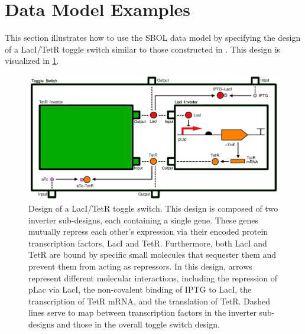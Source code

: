 \section{Data Model Examples}
\label{sec:examples}


This section illustrates how to use the SBOL data model by specifying the design of a LacI/TetR toggle switch similar to those constructed in \cite{Gardner2000}. This design is visualized in \ref{images:toggleswitch_modular}. 


\begin{figure}[ht]
\begin{center}
\includegraphics[scale=0.4]{images/toggleswitch_modular}
\caption[]{Design of a LacI/TetR toggle switch. This design is composed of two inverter sub-designs, each containing a single gene. These genes mutually repress each other's expression via their encoded protein transcription factors, LacI and TetR. Furthermore, both LacI and TetR are bound by specific small molecules that sequester them and prevent them from acting as repressors. In this design, arrows represent different molecular interactions, including the repression of pLac via LacI, the non-covalent binding of IPTG to LacI, the transcription of TetR mRNA, and the translation of TetR. Dashed lines serve to map between transcription factors in the inverter sub-designs and those in the overall toggle switch design.}
\label{images:toggleswitch_modular}
\end{center}
\end{figure}

